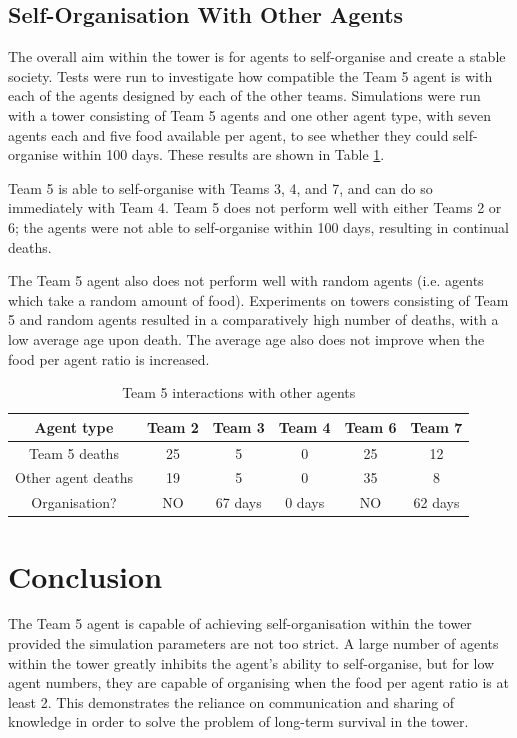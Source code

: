 \subsection*{Self-Organisation With Other Agents}
The overall aim within the tower is for agents to self-organise and create a stable society. Tests were run to investigate how compatible the Team 5 agent is with each of the agents designed by each of the other teams. Simulations were run with a tower consisting of Team 5 agents and one other agent type, with seven agents each and five food available per agent, to see whether they could self-organise within 100 days. These results are shown in Table \ref{tab:team5-self-org-agents}.

Team 5 is able to self-organise with Teams 3, 4, and 7, and can do so immediately with Team 4. Team 5 does not perform well with either Teams 2 or 6; the agents were not able to self-organise within 100 days, resulting in continual deaths.

The Team 5 agent also does not perform well with random agents (i.e. agents which take a random amount of food). Experiments on towers consisting of Team 5 and random agents resulted in a comparatively high number of deaths, with a low average age upon death. The average age also does not improve when the food per agent ratio is increased.

\begin{table}
    \centering
    \begin{tabular}{|c|c|c|c|c|c|}
        \hline
        \textbf{Agent type} & \textbf{Team 2} & \textbf{Team 3}& \textbf{Team 4} & \textbf{Team 6} & \textbf{Team 7}\\
        \hline
        Team 5 deaths & 25 & 5 & 0 & 25 & 12 \\
        \hline
        Other agent deaths & 19 & 5 & 0 & 35 & 8 \\
        \hline
        Organisation? & NO & 67 days & 0 days & NO & 62 days \\
        \hline
    \end{tabular}
    \caption{Team 5 interactions with other agents}
    \label{tab:team5-self-org-agents}
\end{table}

\section{Conclusion}\label{sec:team5-conclusion}
The Team 5 agent is capable of achieving self-organisation within the tower provided the simulation parameters are not too strict. A large number of agents within the tower greatly inhibits the agent's ability to self-organise, but for low agent numbers, they are capable of organising when the food per agent ratio is at least 2. This demonstrates the reliance on communication and sharing of knowledge in order to solve the problem of long-term survival in the tower.

